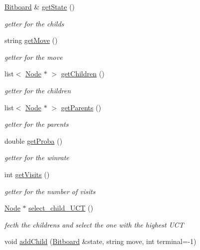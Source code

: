 \begin{DoxyCompactItemize}
\hyperlink{class_bitboard}{Bitboard} \& \hyperlink{classmcts_1_1_node_af2170e0b8de1be9228666b8ef54681f8}{get\+State} ()
\begin{DoxyCompactList}\small\item\em getter for the childs \end{DoxyCompactList}\item 
string \hyperlink{classmcts_1_1_node_ad17cd9cf5c86f718aa99eb6597750d74}{get\+Move} ()
\begin{DoxyCompactList}\small\item\em getter for the move \end{DoxyCompactList}\item 
list$<$ \hyperlink{classmcts_1_1_node}{Node} $\ast$ $>$ \hyperlink{classmcts_1_1_node_a06fe80a95c5535f04c1f952b3e687d56}{get\+Children} ()
\begin{DoxyCompactList}\small\item\em getter for the children \end{DoxyCompactList}\item 
list$<$ \hyperlink{classmcts_1_1_node}{Node} $\ast$ $>$ \hyperlink{classmcts_1_1_node_aa1670c2fae272a00356b88b6a8d382b9}{get\+Parents} ()
\begin{DoxyCompactList}\small\item\em getter for the parents \end{DoxyCompactList}\item 
double \hyperlink{classmcts_1_1_node_a15b5ee0530be2b48df18658f5caa0273}{get\+Proba} ()
\begin{DoxyCompactList}\small\item\em getter for the winrate \end{DoxyCompactList}\item 
int \hyperlink{classmcts_1_1_node_af93b8855df1ad7521b1b8a11ea21c410}{get\+Visits} ()
\begin{DoxyCompactList}\small\item\em getter for the number of visits \end{DoxyCompactList}\item 
\hyperlink{classmcts_1_1_node}{Node} $\ast$ \hyperlink{classmcts_1_1_node_a077c08375da809ea3e7169e827c93009}{select\+\_\+child\+\_\+\+U\+C\+T} ()
\begin{DoxyCompactList}\small\item\em fecth the childrens and select the one with the highest U\+C\+T \end{DoxyCompactList}\item 
void \hyperlink{classmcts_1_1_node_a45a39f5adbbded4245c087a29156a57e}{add\+Child} (\hyperlink{class_bitboard}{Bitboard} \&state, string move, int terminal=-\/1)

\end{DoxyCompactItemize}
